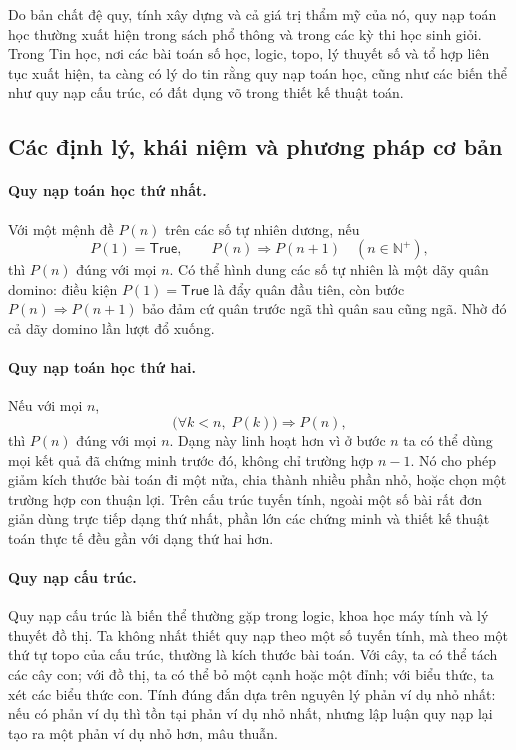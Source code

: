 \documentclass[11pt]{article}
\newcommand{\True}{\mathsf{True}}
\begin{document}
Do bản chất đệ quy, tính xây dựng và cả giá trị thẩm mỹ của nó, quy nạp toán
học thường xuất hiện trong sách phổ thông và trong các kỳ thi học sinh giỏi.
Trong Tin học, nơi các bài toán số học, logic, topo, lý thuyết số và tổ hợp
liên tục xuất hiện, ta càng có lý do tin rằng quy nạp toán học, cũng như các
biến thể như quy nạp cấu trúc, có đất dụng võ trong thiết kế thuật toán.

\subsection{Các định lý, khái niệm và phương pháp cơ bản}

\paragraph{Quy nạp toán học thứ nhất.}
Với một mệnh đề \(P(n)\) trên các số tự nhiên dương, nếu
\[
  P(1)=\True,\qquad P(n)\Rightarrow P(n+1)\quad(n\in\mathbb{N}^{+}),
\]
thì \(P(n)\) đúng với mọi \(n\). Có thể hình dung các số tự nhiên là một dãy
quân domino: điều kiện \(P(1)=\True\) là đẩy quân đầu tiên, còn bước
\(P(n)\Rightarrow P(n+1)\) bảo đảm cứ quân trước ngã thì quân sau cũng ngã.
Nhờ đó cả dãy domino lần lượt đổ xuống.

\paragraph{Quy nạp toán học thứ hai.}
Nếu với mọi \(n\),
\[
  \bigl(\forall k<n,\; P(k)\bigr)\Rightarrow P(n),
\]
thì \(P(n)\) đúng với mọi \(n\). Dạng này linh hoạt hơn vì ở bước \(n\) ta
có thể dùng mọi kết quả đã chứng minh trước đó, không chỉ trường hợp \(n-1\).
Nó cho phép giảm kích thước bài toán đi một nửa, chia thành nhiều phần nhỏ,
hoặc chọn một trường hợp con thuận lợi. Trên cấu trúc tuyến tính, ngoài một
số bài rất đơn giản dùng trực tiếp dạng thứ nhất, phần lớn các chứng minh và
thiết kế thuật toán thực tế đều gần với dạng thứ hai hơn.

\paragraph{Quy nạp cấu trúc.}
Quy nạp cấu trúc là biến thể thường gặp trong logic, khoa học máy tính và lý
thuyết đồ thị. Ta không nhất thiết quy nạp theo một số tuyến tính, mà theo một
thứ tự topo của cấu trúc, thường là kích thước bài toán. Với cây, ta có thể
tách các cây con; với đồ thị, ta có thể bỏ một cạnh hoặc một đỉnh; với biểu
thức, ta xét các biểu thức con. Tính đúng đắn dựa trên nguyên lý phản ví dụ
nhỏ nhất: nếu có phản ví dụ thì tồn tại phản ví dụ nhỏ nhất, nhưng lập luận
quy nạp lại tạo ra một phản ví dụ nhỏ hơn, mâu thuẫn.
\end{document}
